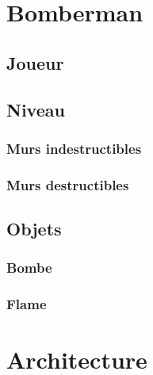 


\section{Bomberman}


\subsection{Joueur}

\subsection{Niveau}

\subsubsection{Murs indestructibles}

\subsubsection{Murs destructibles}

\subsection{Objets}

\subsubsection{Bombe}

\subsubsection{Flame}

\section{Architecture}



